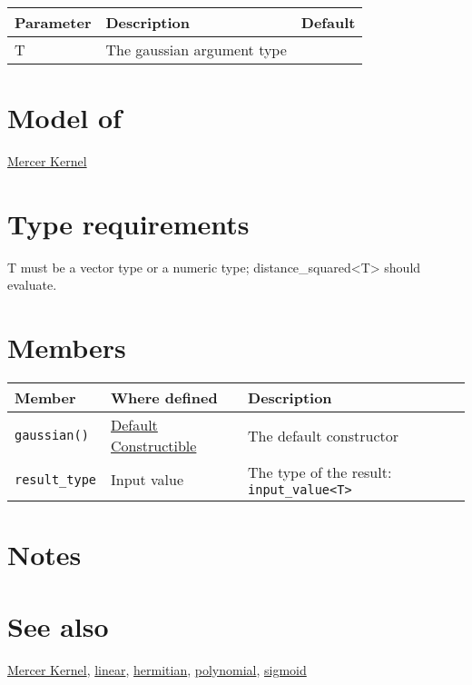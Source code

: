\documentclass{article}
\begin{document}
\begin{tabular}{lll}
\textbf{Parameter} & \textbf{Description} & \textbf{Default} \\ 
\hline
T & The gaussian argument type \\ 
\end{tabular}


\section*{Model of}

\href{\kmlroot/reference/mercer_kernel.html}{Mercer Kernel}

\section*{Type requirements}
T must be a vector type or a numeric type; distance_squared<T> should evaluate.

\section*{Members}

\begin{tabular}{lll}
\textbf{Member} & \textbf{Where defined} & \textbf{Description} \\ 
\hline
\texttt{gaussian()} & \href{http://www.sgi.com/tech/stl/DefaultConstructible.html}{Default Constructible} & The default constructor \\
\texttt{result_type} & Input value & The type of the result: \texttt{input_value<T>} \\
\end{tabular}

\section*{Notes}

\section*{See also}

\href{\kmlroot/reference/mercer_kernel.html}{Mercer Kernel},
\href{\kmlroot/reference/linear.html}{linear},
\href{\kmlroot/reference/hermitian.html}{hermitian},
\href{\kmlroot/reference/polynomial.html}{polynomial},
\href{\kmlroot/reference/sigmoid.html}{sigmoid}



\end{document}
